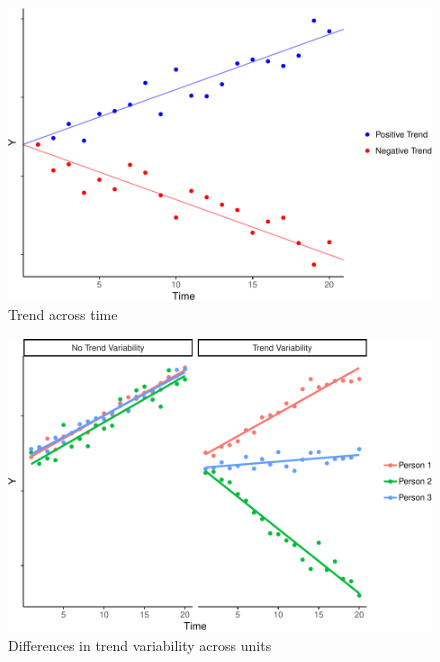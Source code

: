\documentclass[english,,man]{apa6}
\theoremstyle{definition}
\theoremstyle{definition}
\theoremstyle{definition}
\theoremstyle{remark}
\begin{document}
\begin{figure}
\centering
\includegraphics{figures/unnamed-chunk-12-1.pdf}
\caption{\label{fig:unnamed-chunk-12}Trend across time\label{trend}}
\end{figure}

\begin{figure}
\centering
\includegraphics{figures/unnamed-chunk-13-1.pdf}
\caption{\label{fig:unnamed-chunk-13}Differences in trend variability across
units\label{trend_var}}
\end{figure}
\end{document}
